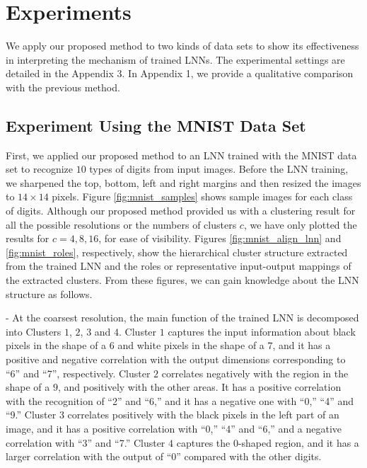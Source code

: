 \documentclass{article}
\begin{document}
\section{Experiments}
\label{sec:experiments}

We apply our proposed method to two kinds of data sets to show its effectiveness in interpreting the mechanism of trained LNNs. The experimental settings are detailed in the Appendix 3. 
In Appendix 1, we provide a qualitative comparison with the previous method\cite{Watanabe2018arxiv2}. 

\subsection{Experiment Using the MNIST Data Set}
\label{sec:mnist}

First, we applied our proposed method to an LNN trained with the MNIST data set\cite{LeCun1998} to recognize $10$ types of digits from input images. 
Before the LNN training, we sharpened the top, bottom, left and right margins and then resized the images to $14\times 14$ pixels. Figure \ref{fig:mnist_samples} shows sample images for each class of digits. 
Although our proposed method provided us with a clustering result for all the possible resolutions or the numbers of clusters $c$, we have only plotted the results for $c=4,8,16$, for ease of visibility. 
Figures \ref{fig:mnist_align_lnn} and \ref{fig:mnist_roles}, respectively, show the hierarchical cluster structure extracted from the trained LNN and the roles or representative input-output mappings of the extracted clusters. 
From these figures, we can gain knowledge about the LNN structure as follows. 

- At the coarsest resolution, the main function of the trained LNN is decomposed into Clusters $1$, $2$, $3$ and $4$. Cluster $1$ captures the input information about black pixels in the shape of a $6$ and white pixels in the shape of a $7$, and it has a positive and negative correlation with the output dimensions corresponding to ``6'' and ``7'', respectively. Cluster $2$ correlates negatively with the region in the shape of a $9$, and positively with the other areas. It has a positive correlation with the recognition of ``2'' and ``6,'' and it has a negative one with ``0,'' ``4'' and ``9.'' Cluster $3$ correlates positively with the black pixels in the left part of an image, and it has a positive correlation with ``0,'' ``4'' and ``6,'' and a negative correlation with ``3'' and ``7.'' Cluster $4$ captures the 0-shaped region, and it has a larger correlation with the output of ``0'' compared with the other digits. 
\end{document}
